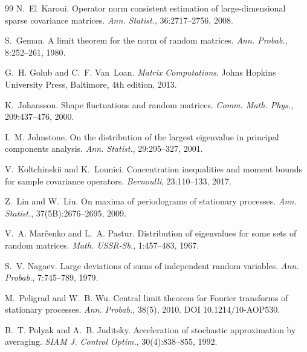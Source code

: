 \documentclass[12pt]{article}
\begin{document}
\begin{thebibliography}{99}
N.~El~Karoui.
\newblock Operator norm consistent estimation of large-dimensional sparse covariance matrices.
\newblock \emph{Ann. Statist.}, 36:2717--2756, 2008.

S.~Geman.
\newblock A limit theorem for the norm of random matrices.
\newblock \emph{Ann. Probab.}, 8:252--261, 1980.

G.~H. Golub and C.~F. Van~Loan.
\newblock \emph{Matrix Computations}.
\newblock Johns Hopkins University Press, Baltimore, 4th edition, 2013.

K.~Johansson.
\newblock Shape fluctuations and random matrices.
\newblock \emph{Comm. Math. Phys.}, 209:437--476, 2000.

I.~M. Johnstone.
\newblock On the distribution of the largest eigenvalue in principal components analysis.
\newblock \emph{Ann. Statist.}, 29:295--327, 2001.

V.~Koltchinskii and K.~Lounici.
\newblock Concentration inequalities and moment bounds for sample covariance operators.
\newblock \emph{Bernoulli}, 23:110--133, 2017.

Z.~Lin and W.~Liu.
\newblock On maxima of periodograms of stationary processes.
\newblock \emph{Ann. Statist.}, 37(5B):2676--2695, 2009.

V.~A. Mar\v{c}enko and L.~A. Pastur.
\newblock Distribution of eigenvalues for some sets of random matrices.
\newblock \emph{Math. USSR-Sb.}, 1:457--483, 1967.

S.~V. Nagaev.
\newblock Large deviations of sums of independent random variables.
\newblock \emph{Ann. Probab.}, 7:745--789, 1979.

M.~Peligrad and W.~B. Wu.
\newblock Central limit theorem for Fourier transforms of stationary processes.
\newblock \emph{Ann. Probab.}, 38(5), 2010. DOI 10.1214/10-AOP530.

B.~T. Polyak and A.~B. Juditsky.
\newblock Acceleration of stochastic approximation by averaging.
\newblock \emph{SIAM J. Control Optim.}, 30(4):838--855, 1992.


\end{thebibliography}
\end{document}
